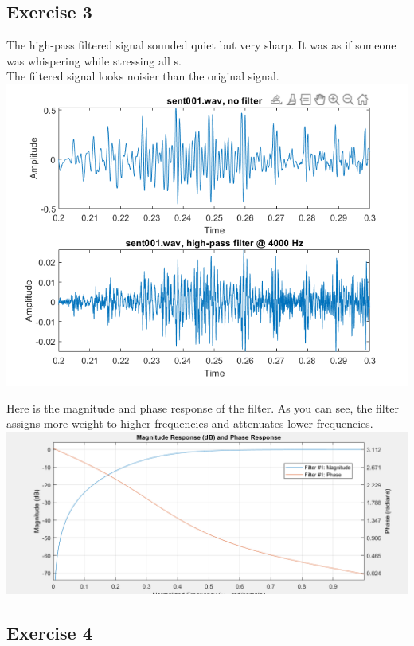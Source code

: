 \documentclass[11pt]{article}
\begin{document}
\pagebreak
\subsection{Exercise 3}

The high-pass filtered signal sounded quiet but very sharp.
It was as if someone was whispering while stressing all s.\\

The filtered signal looks noisier than the original signal.\\




\includegraphics[scale=0.7]{exercise3.png}


Here is the magnitude and phase response of the filter.
As you can see, the filter assigns more weight to higher frequencies and attenuates lower frequencies.\\

\includegraphics[scale=0.7]{high_pass_filter.png}

\subsection{Exercise 4}
\end{document}
